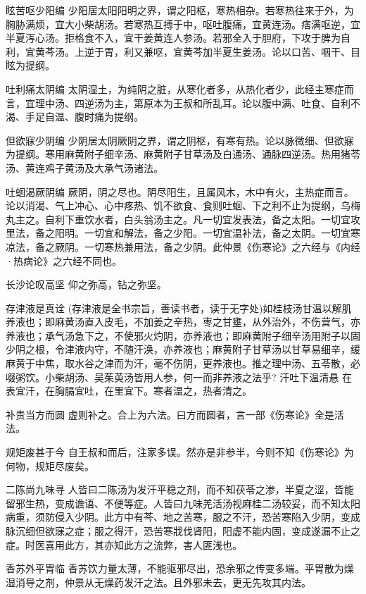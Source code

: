 \documentclass[a4paper,12pt,UTF8,twoside]{ctexbook}
\begin{document}
    眩苦呕少阳编
    少阳居太阳阳明之界，谓之阳枢，寒热相杂。若寒热往来于外，为胸胁满烦，宜大小柴胡汤。若寒热互搏于中，呕吐腹痛，宜黄连汤。痞满呕逆，宜半夏泻心汤。拒格食不入，宜干姜黄连人参汤。若邪全入于胆府，下攻于脾为自利，宜黄芩汤。上逆于胃，利又兼呕，宜黄芩加半夏生姜汤。论以口苦、咽干、目眩为提纲。
    
    吐利痛太阴编
    太阴湿土，为纯阴之脏，从寒化者多，从热化者少，此经主寒症而言，宜理中汤、四逆汤为主，第原本为王叔和所乱耳。论以腹中满、吐食、自利不渴、手足自温、腹时痛为提纲。
    
    但欲寐少阴编
    少阴居太阴厥阴之界，谓之阴枢，有寒有热。论以脉微细、但欲寐为提纲。寒用麻黄附子细辛汤、麻黄附子甘草汤及白通汤、通脉四逆汤。热用猪苓汤、黄连鸡子黄汤及大承气汤诸法。
    
    吐蛔渴厥阴编
    厥阴，阴之尽也。阴尽阳生，且属风木，木中有火，主热症而言。论以消渴、气上冲心、心中疼热、饥不欲食、食则吐蛔、下之利不止为提纲，乌梅丸主之。自利下重饮水者，白头翁汤主之。凡一切宜发表法，备之太阳。一切宜攻里法，备之阳明。一切宜和解法，备之少阳。一切宜温补法，备之太阴。一切宜寒凉法，备之厥阴。一切寒热兼用法，备之少阴。此仲景《伤寒论》之六经与《内经·热病论》之六经不同也。
    
    长沙论叹高坚
    仰之弥高，钻之弥坚。
    
    存津液是真诠
    (存津液是全书宗旨，善读书者，读于无字处)如桂枝汤甘温以解肌养液也；即麻黄汤直入皮毛，不加姜之辛热，枣之甘壅，从外治外，不伤营气，亦养液也；承气汤急下之，不使邪火灼阴，亦养液也；即麻黄附子细辛汤用附子以固少阴之根，令津液内守，不随汗涣，亦养液也；麻黄附子甘草汤以甘草易细辛，缓麻黄于中焦，取水谷之津而为汗，毫不伤阴，更养液也。推之理中汤、五苓散，必啜粥饮。小柴胡汤、吴茱萸汤皆用人参，何一而非养液之法乎?
    汗吐下温清悬
    在表宜汗，在胸膈宜吐，在里宜下。寒者温之，热者清之。
    
    补贵当方而圆
    虚则补之。合上为六法。曰方而圆者，言一部《伤寒论》全是活法。
    
    规矩废甚于今
    自王叔和而后，注家多误。然亦是非参半，今则不知《伤寒论》为何物，规矩尽废矣。
    
    二陈尚九味寻
    人皆曰二陈汤为发汗平稳之剂，而不知茯苓之渗，半夏之涩，皆能留邪生热，变成谵语、不便等症。人皆曰九味羌活汤视麻桂二汤较妥，而不知太阳病重，须防侵入少阴。此方中有芩、地之苦寒，服之不汗，恐苦寒陷入少阴，变成脉沉细但欲寐之症；服之得汗，恐苦寒戕伐肾阳，阳虚不能内固，变成遂漏不止之症。时医喜用此方，其亦知此方之流弊，害人匪浅也。
    
    香苏外平胃临
    香苏饮力量太薄，不能驱邪尽出，恐余邪之传变多端。平胃散为燥湿消导之剂，仲景从无燥药发汗之法。且外邪未去，更无先攻其内法。
    
\end{document}
